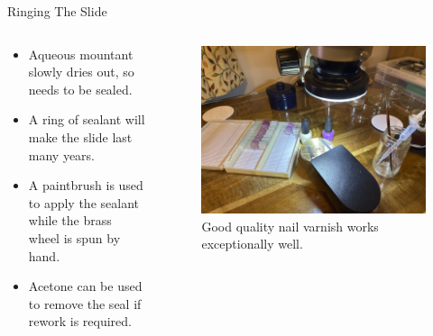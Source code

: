 \documentclass[
  ignorenonframetext,
]{beamer}
\providecommand{\tightlist}{%
  \setlength{\itemsep}{0pt}\setlength{\parskip}{0pt}}
\begin{document}
\begin{frame}{Ringing The Slide}
\protect\hypertarget{ringing-the-slide}{}
\begin{columns}[T]
\begin{column}{0.5\textwidth}
\begin{itemize}
\tightlist
\item
  Aqueous mountant slowly dries out, so needs to be sealed.
\item
  A ring of sealant will make the slide last many years.
\item
  A paintbrush is used to apply the sealant while the brass wheel is
  spun by hand.
\item
  Acetone can be used to remove the seal if rework is required.
\end{itemize}
\end{column}

\begin{column}{0.5\textwidth}
\begin{figure}
\centering
\includegraphics{./images/slideringing.jpg}
\caption{Good quality nail varnish works exceptionally well.}
\end{figure}
\end{column}
\end{columns}
\end{frame}
\end{document}
